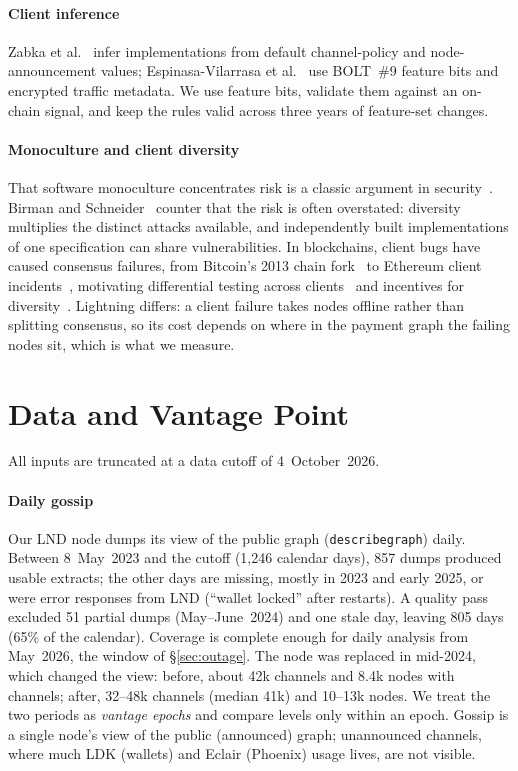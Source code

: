 \documentclass[conference]{IEEEtran}
\begin{document}
\paragraph*{Client inference}
Zabka et al.~\cite{zabka2021node,zabka2022empirical} infer implementations from default channel-policy and
node-announcement values; Espinasa-Vilarrasa et al.~\cite{espinasa2024decision} use BOLT~\#9 feature bits and
encrypted traffic metadata. We use feature bits, validate them against an on-chain signal, and keep the rules
valid across three years of feature-set changes.

\paragraph*{Monoculture and client diversity}
That software monoculture concentrates risk is a classic argument in security~\cite{geer2003cyberinsecurity}.
Birman and Schneider~\cite{birman2009monoculture} counter that the risk is often overstated: diversity multiplies
the distinct attacks available, and independently built implementations of one specification can share
vulnerabilities. In blockchains, client bugs have caused consensus failures, from Bitcoin's 2013 chain
fork~\cite{bip50} to Ethereum client incidents~\cite{prysm2023finality}, motivating differential testing across
clients~\cite{yang2021fluffy} and incentives for diversity~\cite{ron2026clientdiversity}. Lightning differs: a
client failure takes nodes offline rather than splitting consensus, so its cost depends on where in the payment
graph the failing nodes sit, which is what we measure.

\section{Data and Vantage Point}
\label{sec:data}

All inputs are truncated at a data cutoff of 4~October~2026.

\paragraph*{Daily gossip}
Our LND node dumps its view of the public graph (\texttt{describegraph}) daily. Between 8~May~2023 and the cutoff
(1,246 calendar days), 857 dumps produced usable extracts; the other days are missing, mostly in 2023 and early
2025, or were error responses from LND (``wallet locked'' after restarts). A quality pass excluded 51 partial dumps
(May--June~2024) and one stale day, leaving 805 days (65\% of the calendar). Coverage is complete enough for daily
analysis from May~2026, the window of \S\ref{sec:outage}. The node was replaced in mid-2024, which changed the
view: before, about 42k channels and 8.4k nodes with channels; after, 32--48k channels (median 41k) and 10--13k
nodes. We treat the two periods as \emph{vantage epochs} and compare levels only within an epoch. Gossip is a single
node's view of the public (announced) graph; unannounced channels, where much LDK (wallets) and Eclair (Phoenix)
usage lives, are not visible.
\end{document}
